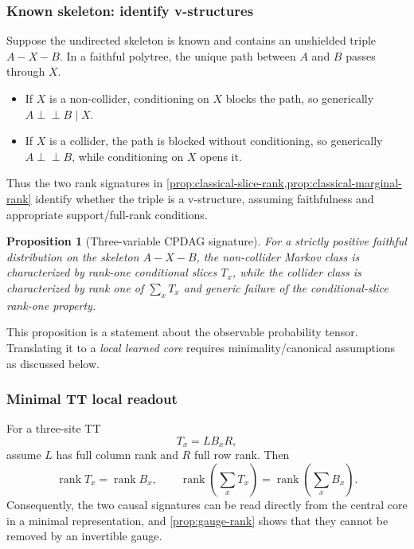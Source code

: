 \documentclass[11pt]{article}
\newtheorem{proposition}[definition]{Proposition}
\theoremstyle{remark}
\newcommand{\indep}{\perp\!\!\!\perp}
\newcommand{\rank}{\operatorname{rank}}
\begin{document}
\subsubsection{Known skeleton: identify v-structures}

Suppose the undirected skeleton is known and contains an unshielded triple $A-X-B$. In a faithful polytree, the unique path between $A$ and $B$ passes through $X$.
\begin{itemize}
\item If $X$ is a non-collider, conditioning on $X$ blocks the path, so generically $A\indep B\mid X$.
\item If $X$ is a collider, the path is blocked without conditioning, so generically $A\indep B$, while conditioning on $X$ opens it.
\end{itemize}
Thus the two rank signatures in \cref{prop:classical-slice-rank,prop:classical-marginal-rank} identify whether the triple is a v-structure, assuming faithfulness and appropriate support/full-rank conditions.

\begin{proposition}[Three-variable CPDAG signature]
For a strictly positive faithful distribution on the skeleton $A-X-B$, the non-collider Markov class is characterized by rank-one conditional slices $T_x$, while the collider class is characterized by rank one of $\sum_xT_x$ and generic failure of the conditional-slice rank-one property.
\end{proposition}
This proposition is a statement about the observable probability tensor. Translating it to a \emph{local learned core} requires minimality/canonical assumptions as discussed below.

\subsubsection{Minimal TT local readout}

For a three-site TT
\begin{equation}
T_x=L B_x R,
\end{equation}
assume $L$ has full column rank and $R$ full row rank. Then
\begin{equation}
\rank T_x=\rank B_x,
\qquad
\rank\!\left(\sum_xT_x\right)=\rank\!\left(\sum_xB_x\right).
\end{equation}
Consequently, the two causal signatures can be read directly from the central core in a minimal representation, and \cref{prop:gauge-rank} shows that they cannot be removed by an invertible gauge.
\end{document}
